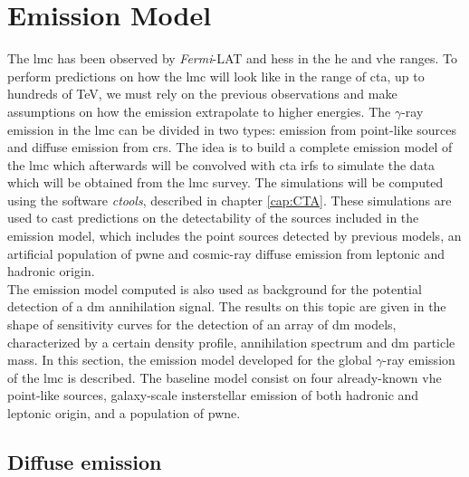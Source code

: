\documentclass[main.tex]{subfiles}
\begin{document}
\section{Emission Model} \label{sec:model}

The \gls{lmc} has been observed by \textit{Fermi}-LAT and \gls{hess} in the \gls{he} and \gls{vhe} ranges. To perform predictions on how the \gls{lmc} will look like in the range of \gls{cta}, up to hundreds of TeV, we must rely on the previous observations and make assumptions on how the emission extrapolate to higher energies. The $\gamma$-ray emission in the \gls{lmc} can be divided in two types: emission from point-like sources and diffuse emission from \glspl{cr}. The idea is to build a complete emission model of the \gls{lmc} which afterwards will be convolved with \gls{cta} \glspl{irf} to simulate the data which will be obtained from the \gls{lmc} survey. The simulations will be computed using the software \textit{ctools}, described in chapter \ref{cap:CTA}. These simulations are used to cast predictions on the detectability of the sources included in the emission model, which includes the point sources detected by previous models, an artificial population of \gls{pwne} and cosmic-ray diffuse emission from leptonic and hadronic origin.\\
The emission model computed is also used as background for the potential detection of a \gls{dm} annihilation signal. The results on this topic are given in the shape of sensitivity curves for the detection of an array of \gls{dm} models, characterized by a certain density profile, annihilation spectrum and \gls{dm} particle mass.
In this section, the emission model developed for the global $\gamma$-ray emission of the \gls{lmc} is described. The baseline model consist on four already-known \gls{vhe} point-like sources, galaxy-scale insterstellar emission of both hadronic and leptonic origin, and a population of \gls{pwne}. 

\subsection{Diffuse emission} \label{sec:diffusemodel}
\end{document}
